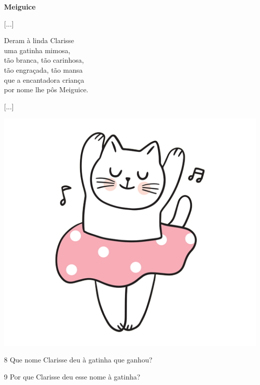 \begin{myquote}
\begin{minipage}{.5\textwidth}
\textbf{Meiguice}

{[}...{]}

Deram à linda Clarisse\\
uma gatinha mimosa,\\
tão branca, tão carinhosa,\\
tão engraçada, tão mansa\\
que a encantadora criança\\
por nome lhe pôs Meiguice.

{[}...{]}
\end{minipage}
\begin{minipage}{.5\textwidth}
\includegraphics[width=\textwidth]{./media/image23.png}
\end{minipage}

\end{myquote}

\num{8} Que nome Clarisse deu à gatinha que ganhou?


\num{9} Por que Clarisse deu esse nome à gatinha?

